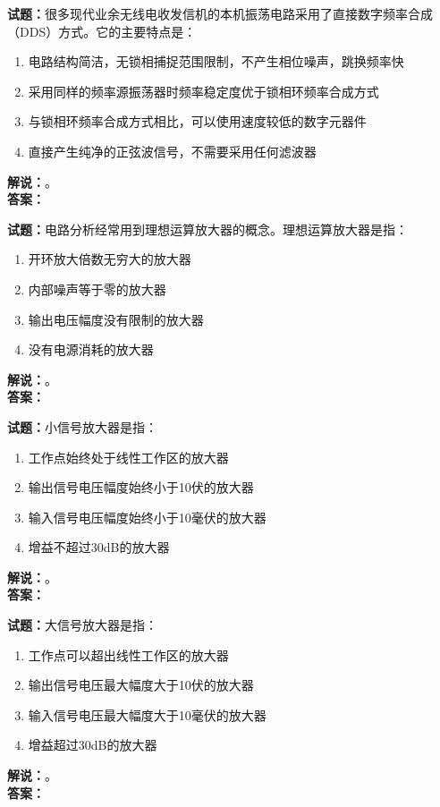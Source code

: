 \documentclass{ctexbook}
\begin{document}
\noindent\textbf{试题：}很多现代业余无线电收发信机的本机振荡电路采用了直接数字频率合成（DDS）方式。它的主要特点是：
\begin{enumerate}[leftmargin=3em]
\item 电路结构简洁，无锁相捕捉范围限制，不产生相位噪声，跳换频率快
\item 采用同样的频率源振荡器时频率稳定度优于锁相环频率合成方式
\item 与锁相环频率合成方式相比，可以使用速度较低的数字元器件
\item 直接产生纯净的正弦波信号，不需要采用任何滤波器
\end{enumerate}
\noindent\textbf{解说：}\textbf{}。\\\noindent\textbf{答案：}

\bigskip




\noindent\textbf{试题：}电路分析经常用到理想运算放大器的概念。理想运算放大器是指：
\begin{enumerate}[leftmargin=3em]
\item 开环放大倍数无穷大的放大器
\item 内部噪声等于零的放大器
\item 输出电压幅度没有限制的放大器
\item 没有电源消耗的放大器
\end{enumerate}
\noindent\textbf{解说：}\textbf{}。\\\noindent\textbf{答案：}

\bigskip




\noindent\textbf{试题：}小信号放大器是指：
\begin{enumerate}[leftmargin=3em]
\item 工作点始终处于线性工作区的放大器
\item 输出信号电压幅度始终小于10伏的放大器
\item 输入信号电压幅度始终小于10毫伏的放大器
\item 增益不超过30dB的放大器
\end{enumerate}
\noindent\textbf{解说：}\textbf{}。\\\noindent\textbf{答案：}

\bigskip




\noindent\textbf{试题：}大信号放大器是指：
\begin{enumerate}[leftmargin=3em]
\item 工作点可以超出线性工作区的放大器
\item 输出信号电压最大幅度大于10伏的放大器
\item 输入信号电压最大幅度大于10毫伏的放大器
\item 增益超过30dB的放大器
\end{enumerate}
\noindent\textbf{解说：}\textbf{}。\\\noindent\textbf{答案：}
\end{document}

